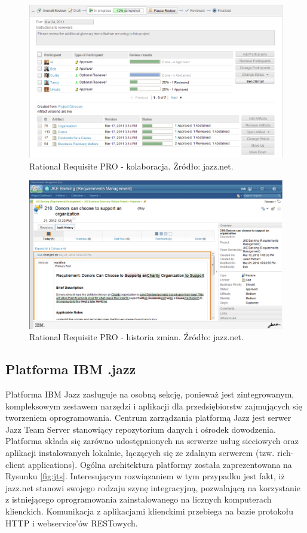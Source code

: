       \begin{figure}[t]
        \centering
        \includegraphics[width=1.0\textwidth]{img/review-and-collaboration.png}
        \caption{Rational Requisite PRO - kolaboracja. Źródło: jazz.net.}
        \label{fig:colla}
      \end{figure}

      \begin{figure}[t]
        \centering
        \includegraphics[width=1.0\textwidth]{img/audit-history.png}
        \caption{Rational Requisite PRO - historia zmian. Źródło: jazz.net.}
        \label{fig:audit}
      \end{figure}

    \subsection{Platforma IBM .jazz}

      Platforma IBM Jazz zasługuje na osobną sekcję, ponieważ jest zintegrowanym, kompleksowym zestawem narzędzi i aplikacji dla przedsiębiorstw zajmujących się tworzeniem oprogramowania. Centrum zarządzania platformą Jazz jest serwer Jazz Team Server stanowiący repozytorium danych i ośrodek dowodzenia. Platforma składa się zarówno udostępnionych na serwerze usług sieciowych oraz aplikacji instalowanych lokalnie, łączących się ze zdalnym serwerem (tzw. rich-client applications). Ogólna architektura platformy została zaprezentowana na Rysunku \ref{fig:jts}. Interesującym rozwiązaniem w tym przypadku jest fakt, iż jazz.net stanowi swojego rodzaju szynę integracyjną, pozwalającą na korzystanie z istniejącego oprogramowania zainstalowanego na licznych komputerach klienckich. Komunikacja z aplikacjami klienckimi przebiega na bazie protokołu HTTP i webservice'ów RESTowych.

